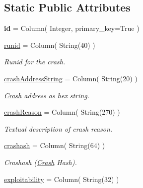 \subsection*{Static Public Attributes}
\begin{DoxyCompactItemize}
\item 
\mbox{\label{classdb_1_1crash_1_1_crash_a597d95a056161794c74be5f752efdd6b}} 
{\bfseries id} = Column( Integer, primary\+\_\+key=True )
\item 
\mbox{\label{classdb_1_1crash_1_1_crash_a004548b6df7b106228b71b27c1aa1b2d}} 
\mbox{\hyperlink{classdb_1_1crash_1_1_crash_a004548b6df7b106228b71b27c1aa1b2d}{runid}} = Column( String(40) )
\begin{DoxyCompactList}\small\item\em Runid for the crash. \end{DoxyCompactList}\item 
\mbox{\label{classdb_1_1crash_1_1_crash_aec335f8efb4de4ec509f8814f8d9e4e6}} 
\mbox{\hyperlink{classdb_1_1crash_1_1_crash_aec335f8efb4de4ec509f8814f8d9e4e6}{crash\+Address\+String}} = Column( String(20) )
\begin{DoxyCompactList}\small\item\em \mbox{\hyperlink{classdb_1_1crash_1_1_crash}{Crash}} address as hex string. \end{DoxyCompactList}\item 
\mbox{\label{classdb_1_1crash_1_1_crash_ab5a6c4f21fec1f47ed8daa4cccbcdcfa}} 
\mbox{\hyperlink{classdb_1_1crash_1_1_crash_ab5a6c4f21fec1f47ed8daa4cccbcdcfa}{crash\+Reason}} = Column( String(270) )
\begin{DoxyCompactList}\small\item\em Textual description of crash reason. \end{DoxyCompactList}\item 
\mbox{\hyperlink{classdb_1_1crash_1_1_crash_abf1e1c371523cd73fac77a550f830598}{crashash}} = Column( String(64) )
\begin{DoxyCompactList}\small\item\em Crashash (\mbox{\hyperlink{classdb_1_1crash_1_1_crash}{Crash}} Hash). \end{DoxyCompactList}\item 
\mbox{\hyperlink{classdb_1_1crash_1_1_crash_a9ce9c656b02c0f83e02c77061617404e}{exploitability}} = Column( String(32) )

\end{DoxyCompactItemize}

